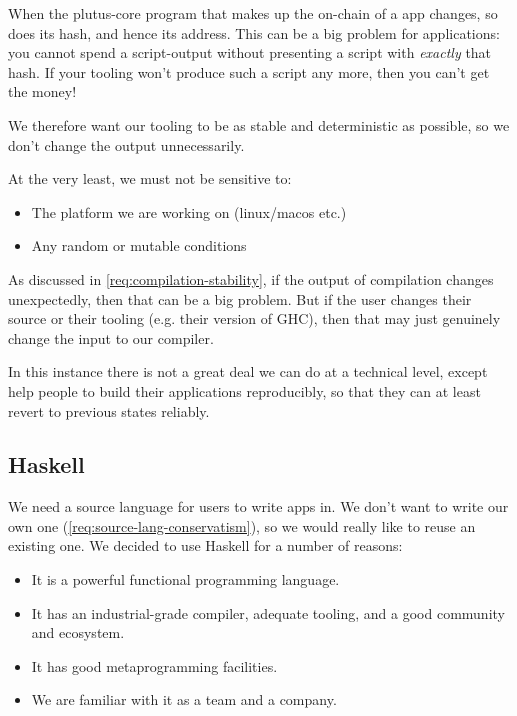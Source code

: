 \begin{requirement}[Stability]
\label{req:compilation-stability}
When the \gls{plutus-core} program that makes up the \gls{on-chain} of a \gls{app} changes, so does its hash, and hence its \gls{address}.
This can be a big problem for applications: you cannot spend a \gls{script-output} without presenting a \gls{script} with \emph{exactly} that hash.
If your tooling won't produce such a \gls{script} any more, then you can't get the money!

We therefore want our tooling to be as stable and deterministic as possible, so we don't change the output unnecessarily.

At the very least, we must not be sensitive to:
\begin{itemize}
\item The platform we are working on (linux/macos etc.)
\item Any random or mutable conditions
\end{itemize}
\end{requirement}

\begin{requirement}
\label{req:compilation-reproducibility}
As discussed in \cref{req:compilation-stability}, if the output of compilation changes unexpectedly, then that can be a big problem.
But if the user changes their source or their tooling (e.g. their version of GHC), then that may just genuinely change the input to our compiler.

In this instance there is not a great deal we can do at a technical level, except help people to build their applications reproducibly, so that
they can at least revert to previous states reliably.
\end{requirement}

\subsection{Haskell}

We need a source language for users to write \glspl{app} in.
We don't want to write our own one (\cref{req:source-lang-conservatism}), so we would really like to reuse an existing one.
We decided to use Haskell for a number of reasons:
\begin{itemize}
\item
  It is a powerful functional programming language.
\item
  It has an industrial-grade compiler, adequate tooling, and a good community and ecosystem.
\item
  It has good metaprogramming facilities.
\item
  We are familiar with it as a team and a company.
\end{itemize}

